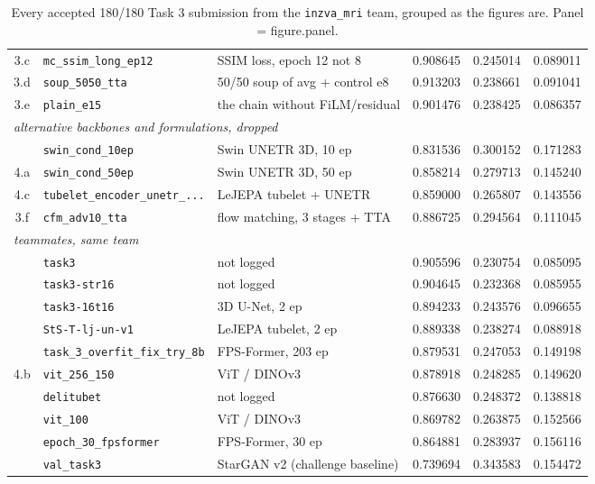 \documentclass[10pt,a4paper]{article}
\begin{document}
\begin{table}[H]
\begin{tabular}{cllrrr}
3.c & \texttt{mc\_ssim\_long\_ep12}          & SSIM loss, epoch 12 not 8       & 0.908645 & 0.245014 & 0.089011 \\
3.d & \texttt{soup\_5050\_tta}               & 50/50 soup of avg + control e8  & 0.913203 & 0.238661 & 0.091041 \\
3.e & \texttt{plain\_e15}                    & the chain without FiLM/residual & 0.901476 & 0.238425 & 0.086357 \\
\midrule
\multicolumn{6}{l}{\itshape alternative backbones and formulations, dropped} \\
    & \texttt{swin\_cond\_10ep}              & Swin UNETR 3D, 10 ep            & 0.831536 & 0.300152 & 0.171283 \\
4.a & \texttt{swin\_cond\_50ep}              & Swin UNETR 3D, 50 ep            & 0.858214 & 0.279713 & 0.145240 \\
4.c & \texttt{tubelet\_encoder\_unetr\_...}  & LeJEPA tubelet + UNETR          & 0.859000 & 0.265807 & 0.143556 \\
3.f & \texttt{cfm\_adv10\_tta}               & flow matching, 3 stages + TTA   & 0.886725 & 0.294564 & 0.111045 \\
\midrule
\multicolumn{6}{l}{\itshape teammates, same team} \\
    & \texttt{task3}                         & not logged                      & 0.905596 & 0.230754 & 0.085095 \\
    & \texttt{task3-str16}                   & not logged                      & 0.904645 & 0.232368 & 0.085955 \\
    & \texttt{task3-16t16}                   & 3D U-Net, 2 ep                  & 0.894233 & 0.243576 & 0.096655 \\
    & \texttt{StS-T-lj-un-v1}                & LeJEPA tubelet, 2 ep            & 0.889338 & 0.238274 & 0.088918 \\
    & \texttt{task\_3\_overfit\_fix\_try\_8b}& FPS-Former, 203 ep              & 0.879531 & 0.247053 & 0.149198 \\
4.b & \texttt{vit\_256\_150}                 & ViT / DINOv3                    & 0.878918 & 0.248285 & 0.149620 \\
    & \texttt{delitubet}                     & not logged                      & 0.876630 & 0.248372 & 0.138818 \\
    & \texttt{vit\_100}                      & ViT / DINOv3                    & 0.869782 & 0.263875 & 0.152566 \\
    & \texttt{epoch\_30\_fpsformer}          & FPS-Former, 30 ep               & 0.864881 & 0.283937 & 0.156116 \\
    & \texttt{val\_task3}                    & StarGAN v2 (challenge baseline) & 0.739694 & 0.343583 & 0.154472 \\
\bottomrule
\end{tabular}
\caption{Every accepted 180/180 Task 3 submission from the \texttt{inzva\_mri} team, grouped as
the figures are. Panel = figure.panel.}
\end{table}
\end{document}
